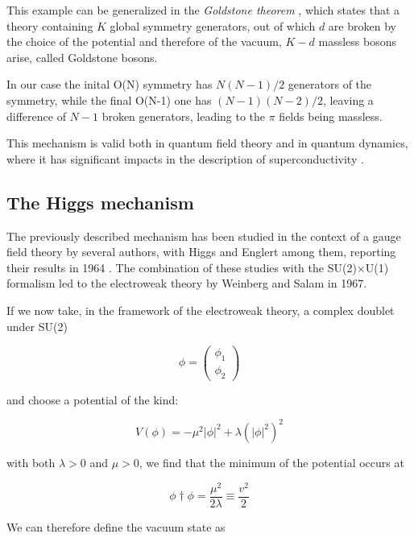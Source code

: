This example can be generalized in the \emph{Goldstone theorem} \cite{1962PhRv..127..965G}, which states that a theory containing $K$ global symmetry generators, out of which $d$ are broken by the choice of the potential and therefore of the vacuum, $K - d$ massless bosons arise, called Goldstone bosons. 

In our case the inital O(N) symmetry has $N(N-1)/2$ generators of the symmetry, while the final O(N-1) one has $(N-1)(N-2)/2$, leaving a difference of $N-1$ broken generators, leading to the $\pi$ fields being massless. 

This mechanism is valid both in quantum field theory and in quantum dynamics, where it has significant impacts in the description of superconductivity \cite{Nambu:1960tm}.

\subsection{The Higgs mechanism}

The previously described mechanism has been studied in the context of a gauge field theory by several authors, with Higgs and Englert among them, reporting their results in 1964 \cite{Englert:1964et, Higgs:1964ia}. The combination of these studies with the SU(2)$\times$U(1) formalism led to the electroweak theory by Weinberg and Salam in 1967.

If we now take, in the framework of the electroweak theory, a complex doublet under SU(2)

\begin{equation}
\phi = \left(\begin{array}{c}\phi_1 \\\phi_2\end{array}\right)
\end{equation}

and choose a potential of the kind:

\begin{equation}
V(\phi) = - \mu^2 |\phi|^2 + \lambda (|\phi|^2)^2
\end{equation}

with both $\lambda > 0$ and $\mu > 0$, we find that the minimum of the potential occurs at 

\begin{equation}
\phi\dag\phi = \dfrac{\mu^2}{2\lambda} \equiv \dfrac{v^2}{2}
\end{equation}

We can therefore define the vacuum state as

